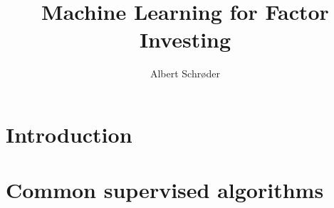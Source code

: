 \documentclass[10pt, oneside]{amsdtx}
\title{Machine Learning for Factor Investing}
\author{Albert Schrøder}
\numberwithin{equation}{section}
\theoremstyle{theorem}
\theoremstyle{definition}
\begin{document}
\maketitle

\newpage

\chapter{Introduction}



\newpage



\newpage



\newpage



\chapter{Common supervised algorithms}


\end{document}
